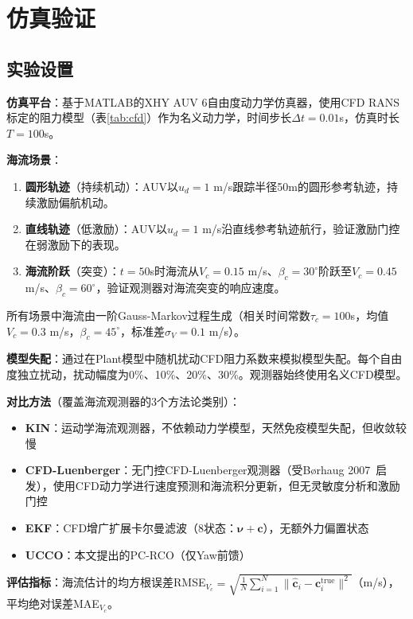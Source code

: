 \section{仿真验证}

\subsection{实验设置}

\textbf{仿真平台}：基于MATLAB的XHY AUV 6自由度动力学仿真器，使用CFD RANS标定的阻力模型（表\ref{tab:cfd}）作为名义动力学，时间步长$\Delta t=0.01$s，仿真时长$T=100$s。

\textbf{海流场景}：
\begin{enumerate}
    \item \textbf{圆形轨迹}（持续机动）：AUV以$u_d=1$ m/s跟踪半径50m的圆形参考轨迹，持续激励偏航机动。
    \item \textbf{直线轨迹}（低激励）：AUV以$u_d=1$ m/s沿直线参考轨迹航行，验证激励门控在弱激励下的表现。
    \item \textbf{海流阶跃}（突变）：$t=50$s时海流从$V_c=0.15$ m/s、$\beta_c=30^\circ$阶跃至$V_c=0.45$ m/s、$\beta_c=60^\circ$，验证观测器对海流突变的响应速度。
\end{enumerate}

所有场景中海流由一阶Gauss-Markov过程生成（相关时间常数$\tau_c=100$s，均值$V_c=0.3$ m/s，$\beta_c=45^\circ$，标准差$\sigma_V=0.1$ m/s）。

\textbf{模型失配}：通过在Plant模型中随机扰动CFD阻力系数来模拟模型失配。每个自由度独立扰动，扰动幅度为0\%、10\%、20\%、30\%。观测器始终使用名义CFD模型。

\textbf{对比方法}（覆盖海流观测器的3个方法论类别）：
\begin{itemize}
    \item \textbf{KIN}：运动学海流观测器\cite{liang2018three}，不依赖动力学模型，天然免疫模型失配，但收敛较慢
    \item \textbf{CFD-Luenberger}：无门控CFD-Luenberger观测器（受B{\o}rhaug 2007~\cite{borhaug2007model}启发），使用CFD动力学进行速度预测和海流积分更新，但无灵敏度分析和激励门控
    \item \textbf{EKF}：CFD增广扩展卡尔曼滤波（8状态：$\bm{\nu}+\bm{c}$），无额外力偏置状态
    \item \textbf{UCCO}：本文提出的PC-RCO（仅Yaw前馈）
\end{itemize}

\textbf{评估指标}：海流估计的均方根误差RMSE$_{V_c}=\sqrt{\frac{1}{N}\sum_{i=1}^{N}\|\hat{\bm{c}}_i-\bm{c}_i^{\text{true}}\|^2}$（m/s），平均绝对误差MAE$_{V_c}$。

